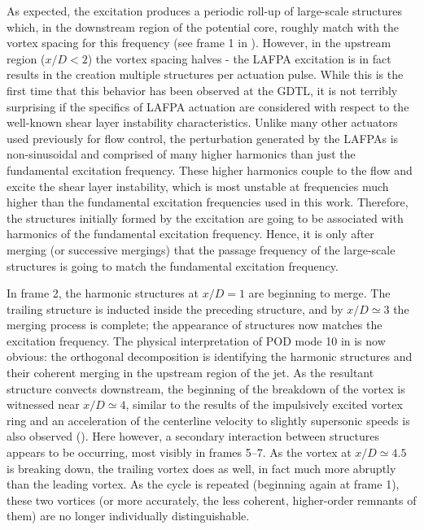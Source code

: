 
As expected, the excitation produces a periodic roll-up of large-scale structures which, in the downstream region of the potential core, roughly match with the vortex spacing for this frequency (see frame 1 in ).
However, in the upstream region ($x/D < 2$) the vortex spacing halves - the LAFPA excitation is in fact results in the creation multiple structures per actuation pulse.
While this is the first time that this behavior has been observed at the GDTL, it is not terribly surprising if the specifics of LAFPA actuation are considered with respect to the well-known shear layer instability characteristics.
Unlike many other actuators used previously for flow control, the perturbation generated by the LAFPAs is non-sinusoidal and comprised of many higher harmonics than just the fundamental excitation frequency.
These higher harmonics couple to the flow and excite the shear layer instability, which is most unstable at frequencies much higher than the fundamental excitation frequencies used in this work.
Therefore, the structures initially formed by the excitation are going to be associated with harmonics of the fundamental excitation frequency.
Hence, it is only after merging (or successive mergings) that the passage frequency of the large-scale structures is going to match the fundamental excitation frequency.

In frame 2, the harmonic structures at $x/D = 1$ are beginning to merge.
The trailing structure is inducted inside the preceding structure, and by $x/D \simeq 3$ the merging process is complete; the appearance of structures now matches the excitation frequency.
The physical interpretation of POD mode 10 in  is now obvious: the orthogonal decomposition is identifying the harmonic structures and their coherent merging in the upstream region of the jet.
As the resultant structure convects downstream, the beginning of the breakdown of the vortex is witnessed near $x/D \simeq 4$, similar to the results of the impulsively excited vortex ring and an acceleration of the centerline velocity to slightly supersonic speeds is also observed ().
Here however, a secondary interaction between structures appears to be occurring, most visibly in frames 5--7. 
As the vortex at $x/D \simeq 4.5$ is breaking down, the trailing vortex does as well, in fact much more abruptly than the leading vortex.
As the cycle is repeated (beginning again at frame 1), these two vortices (or more accurately, the less coherent, higher-order remnants of them) are no longer individually distinguishable.

